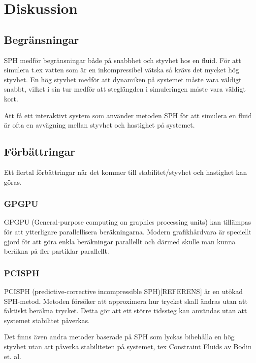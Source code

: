 \documentclass[a4paper,12pt,oneside,final]{extarticle}
\begin{document}
\section{Diskussion}
\subsection{Begränsningar}
SPH medför begränsningar både på snabbhet och styvhet hos en fluid.
För att simulera t.ex vatten som är en inkompressibel vätska så krävs det mycket hög styvhet.
En hög styvhet medför att dynamiken på systemet måste vara väldigt snabbt, vilket i sin tur medför att steglängden i simuleringen måste vara väldigt kort.

Att få ett interaktivt system som använder metoden SPH för att simulera en fluid är ofta en avvägning mellan styvhet och hastighet på systemet. 
\subsection{Förbättringar}
Ett flertal förbättringar när det kommer till stabilitet/styvhet och hastighet kan göras.
\subsubsection{GPGPU}
GPGPU (General-purpose computing on graphics processing units) kan tillämpas för att ytterligare parallellisera beräkningarna.
Modern grafikhårdvara är speciellt gjord för att göra enkla beräkningar parallellt och därmed skulle man kunna beräkna på fler partiklar parallellt.

\subsubsection{PCISPH}
PCISPH (predictive-corrective incompressible SPH)[REFERENS] är en utökad SPH-metod.
Metoden försöker att approximera hur trycket skall ändras utan att faktiskt beräkna trycket.
Detta gör att ett större tidssteg kan användas utan att systemet stabilitet påverkas.

Det finns även andra metoder baserade på SPH som lyckas bibehålla en hög styvhet utan att påverka stabiliteten på systemet, tex Constraint Fluids\cite{bodin} av Bodin et. al.

\end{document}
